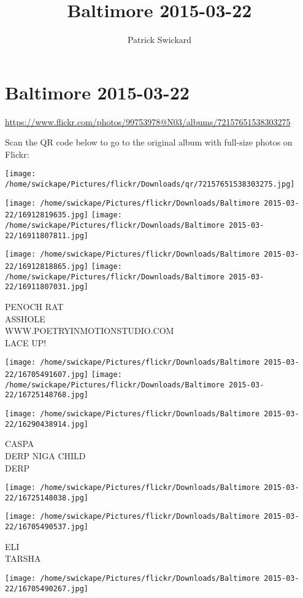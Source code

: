 \documentclass[10pt,letterpaper]{article}
\title{Baltimore 2015-03-22}
\author{Patrick Swickard}
\date{}
\begin{document}
\section*{Baltimore 2015-03-22}

\url{https://www.flickr.com/photos/99753978@N03/albums/72157651538303275}

Scan the QR code below to go to the original album with full-size photos on Flickr:

\texttt{[image: /home/swickape/Pictures/flickr/Downloads/qr/72157651538303275.jpg]}
\pagebreak

\texttt{[image: /home/swickape/Pictures/flickr/Downloads/Baltimore 2015-03-22/16912819635.jpg]}
\texttt{[image: /home/swickape/Pictures/flickr/Downloads/Baltimore 2015-03-22/16911807811.jpg]}

\texttt{[image: /home/swickape/Pictures/flickr/Downloads/Baltimore 2015-03-22/16912818865.jpg]}
\texttt{[image: /home/swickape/Pictures/flickr/Downloads/Baltimore 2015-03-22/16911807031.jpg]}

PENOCH RAT\\
ASSHOLE\\
WWW.POETRYINMOTIONSTUDIO.COM\\
LACE UP!
\pagebreak

\texttt{[image: /home/swickape/Pictures/flickr/Downloads/Baltimore 2015-03-22/16705491607.jpg]}
\texttt{[image: /home/swickape/Pictures/flickr/Downloads/Baltimore 2015-03-22/16725148768.jpg]}

\vspace{0.25in}
\texttt{[image: /home/swickape/Pictures/flickr/Downloads/Baltimore 2015-03-22/16290438914.jpg]}

CASPA\\
DERP NIGA CHILD\\
DERP
\pagebreak

\texttt{[image: /home/swickape/Pictures/flickr/Downloads/Baltimore 2015-03-22/16725148038.jpg]}

\vspace{0.25in}
\texttt{[image: /home/swickape/Pictures/flickr/Downloads/Baltimore 2015-03-22/16705490537.jpg]}

ELI\\
TARSHA
\pagebreak

\texttt{[image: /home/swickape/Pictures/flickr/Downloads/Baltimore 2015-03-22/16705490267.jpg]}
\end{document}
